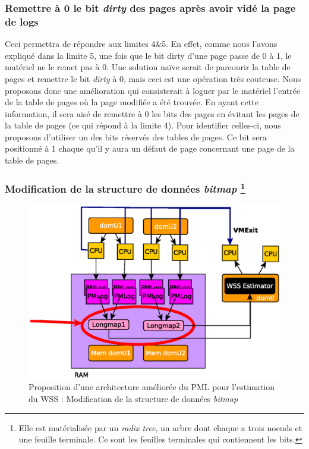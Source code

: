 \subsubsection{Remettre à 0 le bit \textit{dirty} des pages après avoir vidé la page de logs}
Ceci permettra de répondre aux limites 4\&5. En effet, comme nous l'avons expliqué dans la limite 5, une fois que le bit dirty d'une page passe de 0 à 1, le matériel ne le remet pas à 0. Une solution naïve serait de parcourir la table de pages et remettre le bit \textit{dirty} à 0, mais ceci est une opération très couteuse. Nous proposons donc une amélioration qui consisterait à loguer par le matériel l'entrée de la table de pages où la page modifiée a été trouvée. En ayant cette information, il sera aisé de remettre à 0 les bits des pages en évitant les pages de la table de pages (ce qui répond à la limite 4). Pour identifier celles-ci, nous proposons d'utiliser un des bits réservés des tables de pages. Ce bit sera positionné à 1 chaque qu'il y aura un défaut de page concernant une page de la table de pages.

\subsubsection{Modification de la structure de données \textit{bitmap} \footnote{Elle est matérialisée par un \textit{radix tree}, un arbre dont chaque a trois noeuds et une feuille terminale. Ce sont les feuilles terminales qui contiennent les bits.}}
\begin{figure}[htp]
    \centering
    \includegraphics[scale=.8]{chapters/3/fig3/PMLOverview3}
    \caption{Proposition d'une architecture améliorée du PML pour l'estimation du WSS : Modification de la structure de données \textit{bitmap}}
    \label{fig:bitmap}
\end{figure}

